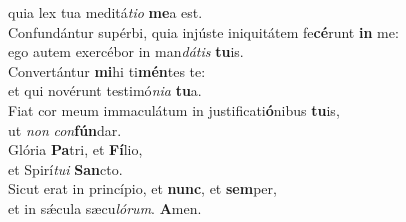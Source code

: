 \oddverse quia lex tua meditá\textit{ti}\textit{o} \textbf{me}a est.\\
\evenverse Confundántur supérbi, quia injúste iniquitátem fe\textbf{cé}runt \textbf{in} me:~\*\\
\evenverse ego autem exercébor in man\textit{dá}\textit{tis} \textbf{tu}is.\\
\oddverse Convertántur \textbf{mi}hi ti\textbf{mén}tes te:~\*\\
\oddverse et qui novérunt testimó\textit{ni}\textit{a} \textbf{tu}a.\\
\evenverse Fiat cor meum immaculátum in justificati\textbf{ó}nibus \textbf{tu}is,~\*\\
\evenverse ut \textit{non} \textit{con}\textbf{fún}dar.\\
\oddverse Glória \textbf{Pa}tri, et \textbf{Fí}lio,~\*\\
\oddverse et Spirí\textit{tu}\textit{i} \textbf{San}cto.\\
\evenverse Sicut erat in princípio, et \textbf{nunc}, et \textbf{sem}per,~\*\\
\evenverse et in sǽcula sæcu\textit{ló}\textit{rum}. \textbf{A}men.\\
